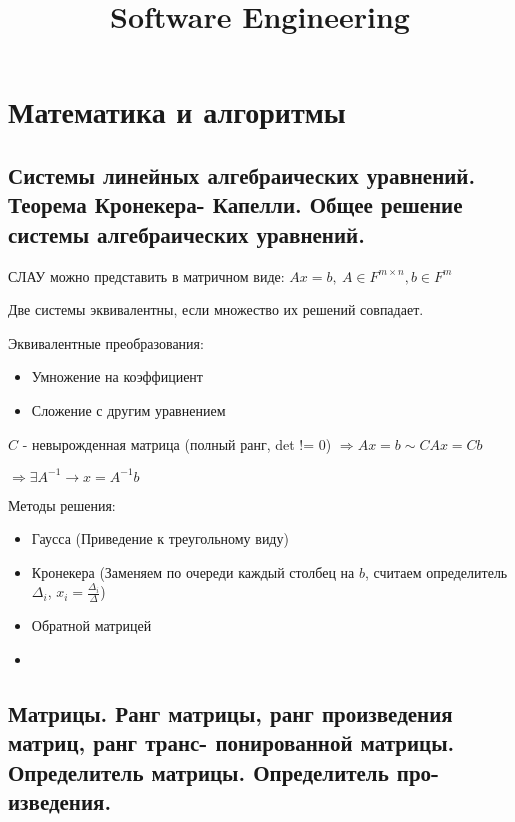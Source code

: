 \documentclass{article}
\title{Software Engineering} %
\begin{document}
\maketitle %

\section{Математика и алгоритмы}

\subsection{Системы линейных алгебраических уравнений. Теорема Кронекера-
Капелли. Общее решение системы алгебраических уравнений.}


СЛАУ можно представить в матричном виде: $Ax = b,\ A \in F^{m\times n}, b \in F^m$

Две системы эквивалентны, если множество их решений совпадает.

Эквивалентные преобразования:
\begin{itemize}
    \item Умножение на коэффициент
    \item Сложение с другим уравнением
\end{itemize}

$C$ - невырожденная матрица (полный ранг, det != 0)
$\Rightarrow Ax = b \sim CA x = C b$

$\Rightarrow \exists A^{-1} \rightarrow x = A^{-1} b$


Методы решения:
\begin{itemize}
    \item Гаусса (Приведение к треугольному виду)
    \item Кронекера (Заменяем по очереди каждый столбец на $b$,
    считаем определитель $\Delta_i$, $x_i = \frac{\Delta_i}{\Delta}$)
    \item Обратной матрицей
    \item 
\end{itemize}


\subsection{Матрицы. Ранг матрицы, ранг произведения матриц, ранг транс-
понированной матрицы. Определитель матрицы. Определитель про-
изведения.}
\end{document}
